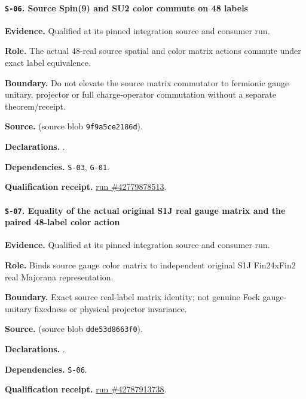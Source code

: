 \paragraph{\texttt{S-06}. Source Spin(9) and SU2 color commute on 48 labels}
\noindent\textbf{Evidence.} Qualified at its pinned integration source and consumer run.
\par\noindent\textbf{Role.} The actual 48-real source spatial and color matrix actions commute under exact label equivalence.
\par\noindent\textbf{Boundary.} Do not elevate the source matrix commutator to fermionic gauge unitary, projector or full charge-operator commutation without a separate theorem/receipt.
\par\noindent\textbf{Source.}  (source blob \texttt{9f9a5ce2186d}).
\par\noindent\textbf{Declarations.} .
\par\noindent\textbf{Dependencies.} \texttt{S-03}, \texttt{G-01}.
\par\noindent\textbf{Qualification receipt.} \href{https://github.com/etblink/math/actions/runs/42779878513}{run \#42779878513}.
\medskip

\paragraph{\texttt{S-07}. Equality of the actual original S1J real gauge matrix and the paired 48-label color action}
\noindent\textbf{Evidence.} Qualified at its pinned integration source and consumer run.
\par\noindent\textbf{Role.} Binds source gauge color matrix to independent original S1J Fin24xFin2 real Majorana representation.
\par\noindent\textbf{Boundary.} Exact source real-label matrix identity; not genuine Fock gauge-unitary fixedness or physical projector invariance.
\par\noindent\textbf{Source.}  (source blob \texttt{dde53d8663f0}).
\par\noindent\textbf{Declarations.} .
\par\noindent\textbf{Dependencies.} \texttt{S-06}.
\par\noindent\textbf{Qualification receipt.} \href{https://github.com/etblink/math/actions/runs/42787913738}{run \#42787913738}.
\medskip

